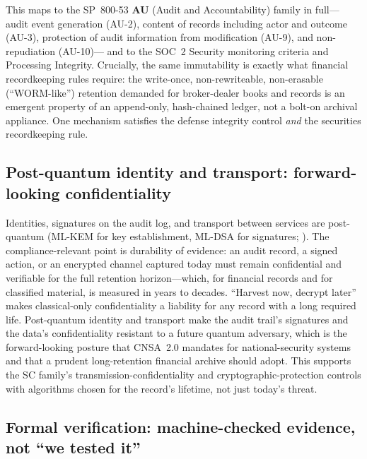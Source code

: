 \documentclass[11pt,letterpaper]{article}
\begin{document}
This maps to the SP~800-53 \textbf{AU} (Audit and Accountability) family in full---
audit event generation (AU-2), content of records including actor and outcome (AU-3),
protection of audit information from modification (AU-9), and non-repudiation (AU-10)---
and to the SOC~2 Security monitoring criteria and Processing Integrity. Crucially,
the same immutability is exactly what financial recordkeeping rules require: the
write-once, non-rewriteable, non-erasable (``WORM-like'') retention demanded for
broker-dealer books and records is an emergent property of an append-only,
hash-chained ledger, not a bolt-on archival appliance. One mechanism satisfies the
defense integrity control \emph{and} the securities recordkeeping rule.

\subsection{Post-quantum identity and transport: forward-looking confidentiality}
\label{sec:pq}

Identities, signatures on the audit log, and transport between services are
post-quantum (ML-KEM for key establishment, ML-DSA for signatures; ).
The compliance-relevant point is durability of evidence: an audit record, a signed
action, or an encrypted channel captured today must remain confidential and
verifiable for the full retention horizon---which, for financial records and for
classified material, is measured in years to decades. ``Harvest now, decrypt later''
makes classical-only confidentiality a liability for any record with a long required
life. Post-quantum identity and transport make the audit trail's signatures and the
data's confidentiality resistant to a future quantum adversary, which is the
forward-looking posture that CNSA~2.0 mandates for national-security systems and that
a prudent long-retention financial archive should adopt. This supports the SC family's
transmission-confidentiality and cryptographic-protection controls with algorithms
chosen for the record's lifetime, not just today's threat.

\subsection{Formal verification: machine-checked evidence, not ``we tested it''}
\end{document}
